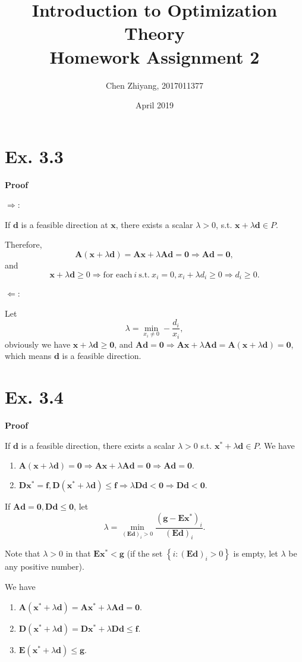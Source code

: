 \documentclass[12pt]{article}
\title{Introduction to Optimization Theory\\Homework Assignment 2}
\author{Chen Zhiyang, 2017011377}
\date{April 2019}
\begin{document}
\maketitle

\section*{Ex. 3.3}
\textbf{Proof}

$\Rightarrow$:

If $\bm{d}$ is a feasible direction at $\bm{x}$, there exists a scalar $\lambda>0$, s.t. $\bm{x}+\lambda\bm{d}\in P$.

Therefore, $$\bm{A}(\bm{x}+\lambda\bm{d})=\bm{Ax}+\lambda\bm{A}\bm{d}=\bm{0}\Rightarrow \bm{A}\bm{d}=\bm{0},$$ and $$\bm{x}+\lambda\bm{d}\ge 0\Rightarrow \text{for each}\ i\ \text{s.t.}\ x_i=0, x_i+\lambda d_i\ge 0\Rightarrow d_i\ge 0.$$

$\Leftarrow$:

Let $$\lambda=\min_{x_i\neq 0}-\dfrac{d_i}{x_i},$$ obviously we have $\bm{x}+\lambda\bm{d}\ge\bm{0}$, and $\bm{Ad}=\bm{0}\Rightarrow\bm{Ax}+\lambda\bm{Ad}=\bm{A}(\bm{x}+\lambda\bm{d})=\bm{0}$, which means $\bm{d}$ is a feasible direction.

\section*{Ex. 3.4}
\textbf{Proof}

If $\bm{d}$ is a feasible direction, there exists a scalar $\lambda>0$ s.t. $\bm{x^*}+\lambda\bm{d}\in P$. We have
\begin{enumerate}[(1)]
    \item $\bm{A}(\bm{x}+\lambda\bm{d})=\bm{0}\Rightarrow\bm{Ax}+\lambda\bm{Ad}=\bm{0}\Rightarrow\bm{Ad}=\bm{0}.$
    \item $\bm{Dx^*}=\bm{f},\bm{D}(\bm{x^*}+\lambda\bm{d})\le\bm{f}\Rightarrow\lambda\bm{Dd}<\bm{0}\Rightarrow\bm{Dd}<\bm{0}.$
\end{enumerate}
If $\bm{Ad}=\bm{0},\bm{Dd}\le\bm{0}$, let $$\lambda=\min_{(\bm{Ed})_i>0}\dfrac{(\bm{g}-\bm{Ex^*})_i}{(\bm{Ed})_i}.$$

Note that $\lambda>0$ in that $\bm{Ex^*}<\bm{g}$ (if the set $\left\{i:(\bm{Ed})_i>0\right\}$ is empty, let $\lambda$ be any positive number).

We have
\begin{enumerate}[(1)]
    \item $\bm{A}(\bm{x^*}+\lambda\bm{d})=\bm{Ax^*}+\lambda\bm{Ad}=\bm{0}.$
    \item $\bm{D}(\bm{x^*}+\lambda\bm{d})=\bm{Dx^*}+\lambda\bm{Dd}\le\bm{f}.$
    \item $\bm{E}(\bm{x^*}+\lambda\bm{d})\le\bm{g}.$
\end{enumerate}
\end{document}
